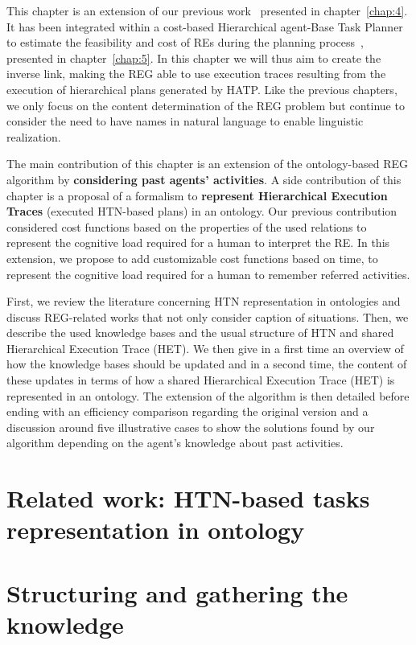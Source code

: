 This chapter is an extension of our previous work~\cite{buisan_2020_efficient} presented in chapter~\ref{chap:4}. It has been integrated within a cost-based Hierarchical agent-Base Task Planner to estimate the feasibility and cost of REs during the planning process~\cite{buisan_2020_human}, presented in chapter~\ref{chap:5}. In this chapter we will thus aim to create the inverse link, making the REG able to use execution traces resulting from the execution of hierarchical plans generated by HATP. Like the previous chapters, we only focus on the content determination of the REG problem but continue to consider the need to have names in natural language to enable linguistic realization.

The main contribution of this chapter is an extension of the ontology-based REG algorithm by \textbf{considering past agents' activities}. A side contribution of this chapter is a proposal of a formalism to \textbf{represent Hierarchical Execution Traces} (executed HTN-based plans) in an ontology. Our previous contribution considered cost functions based on the properties of the used relations to represent the cognitive load required for a human to interpret the RE. In this extension, we propose to add customizable cost functions based on time, to represent the cognitive load required for a human to remember referred activities.

First, we review the literature concerning HTN representation in ontologies and discuss REG-related works that not only consider caption of situations. Then, we describe the used knowledge bases and the usual structure of HTN and shared Hierarchical Execution Trace (HET). We then give in a first time an overview of how the knowledge bases should be updated and in a second time, the content of these updates in terms of how a shared Hierarchical Execution Trace (HET) is represented in an ontology. The extension of the algorithm is then detailed before ending with an efficiency comparison regarding the original version and a discussion around five illustrative cases to show the solutions found by our algorithm depending on the agent's knowledge about past activities.

\section[Related work]{Related work: HTN-based tasks representation in ontology}

\section{Structuring and gathering the knowledge}

